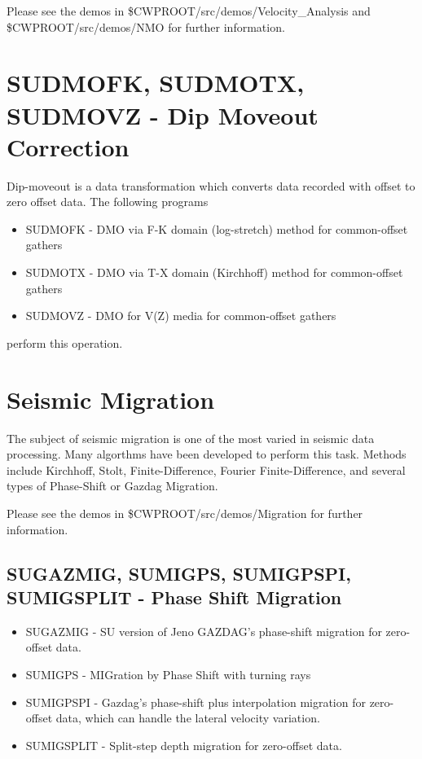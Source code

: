 {{{{{{{Please see the demos in  \$CWPROOT/src/demos/Velocity\_Analysis
and \$CWPROOT/src/demos/NMO for further information. 

\section{SUDMOFK, SUDMOTX, SUDMOVZ - Dip Moveout Correction}

Dip-moveout is a data transformation which converts data recorded
with offset to zero offset data.
The following programs
\begin{itemize}
\item SUDMOFK - DMO via F-K domain (log-stretch) method for common-offset gathers
\item SUDMOTX - DMO via T-X domain (Kirchhoff) method for common-offset gathers
\item SUDMOVZ - DMO for V(Z) media for common-offset gathers 
\end{itemize}
perform this operation.

\section{Seismic Migration}
The subject of seismic migration is one of the most varied in
seismic data processing. Many algorthms have been developed
to perform this task. 
Methods include Kirchhoff, Stolt, Finite-Difference,
Fourier Finite-Difference, and several types of Phase-Shift
or Gazdag Migration.

Please see the demos in \$CWPROOT/src/demos/Migration
for further information.

\subsection{SUGAZMIG, SUMIGPS, SUMIGPSPI, SUMIGSPLIT - Phase Shift Migration}
\begin{itemize}
\item SUGAZMIG - SU version of Jeno GAZDAG's phase-shift migration for
zero-offset data. 
\item SUMIGPS - MIGration by Phase Shift with turning rays 
\item SUMIGPSPI - Gazdag's phase-shift plus interpolation migration         
for zero-offset data, which can handle the lateral velocity variation.
\item SUMIGSPLIT - Split-step depth migration for zero-offset data.
\end{itemize}

}}}}}}}
